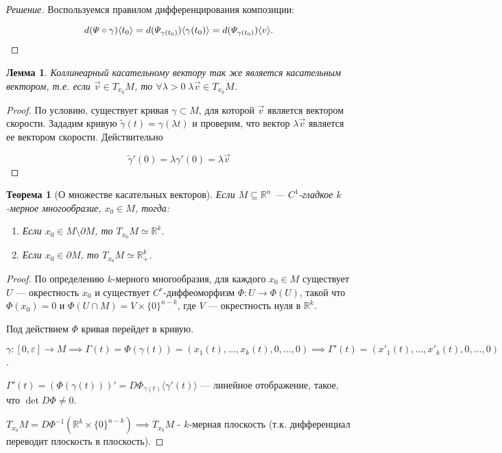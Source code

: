 \documentclass[a5paper]{article}
\newcounter{through}
\theoremstyle{plain}
\newtheorem{theorem}[through]{Теорема}
\newtheorem{lemma}[through]{Лемма}
\theoremstyle{definition}
\numberwithin{through}{section}
\numberwithin{equation}{section}
\begin{document}
\begin{proof}[Решение]
	Воспользуемся правилом дифференцирования композиции:
	
	\begin{equation*}
		d(\varPsi \circ \gamma) \langle t_0 \rangle = d(\varPsi_{\gamma(t_0)}) \langle \gamma(t_0) \rangle = 
		d(\varPsi_{\gamma(t_0)}) \langle v \rangle.
	\qedhere
	\end{equation*}
\end{proof}

\begin{lemma}
	Коллинеарный касательному вектору так же является касательным вектором, т.е. 
	если $\vec{v} \in T_{x_0}M$, то $\forall \lambda > 0 \; \lambda \vec{v} \in T_{x_0}M$.
\end{lemma}

\begin{proof}
	По условию, существует кривая $\gamma \subset M$, для которой $\vec{v}$ является вектором скорости. Зададим кривую $\tilde{\gamma}(t)=\gamma(\lambda t)$ и проверим, что вектор $\lambda \vec{v}$ является ее вектором скорости. Действительно 
	
	\begin{equation*}
		\tilde{\gamma}'(0) = \lambda \gamma'(0) = \lambda \vec{v}
	\end{equation*}
\end{proof}

\begin{theorem}[О множестве касательных векторов]
	Если $M \subseteq \mathbb{R}^n$ --- $C^1$-гладкое $k$-мерное многообразие,
	$x_0 \in M$, тогда:
	
	\begin{enumerate}
		\item 
		Если $x_0 \in M \setminus \partial M$, то $T_{x_0}M \simeq 
		\mathbb{R}^k$.
		
		\item 
		Если $x_0 \in \partial M$, то $T_{x_0}M \simeq 
		\mathbb{R}_+^k$.
	\end{enumerate}
\end{theorem}

\begin{proof}
	По определению $k$-мерного многообразия, для каждого $x_0 \in M$ существует $U$ --- окрестность $x_0$ и существует $ C^r$-диффеоморфизм $\Phi : U \to \Phi (U)$, такой что $\Phi(x_0)=0$ и $\Phi(U \cap M) = V \times \{0\}^{n-k}$, где $V$ --- окрестность нуля в $\mathbb{R}^k$.
	
	Под действием $\Phi$ кривая перейдет в кривую.
	
	$\gamma : [0, \varepsilon] \to M \implies \Gamma(t) = 
	\Phi(\gamma(t)) = (x_1(t), \ldots, x_k(t), 0, \ldots, 0) 
	\implies \Gamma'(t) =(x'_1(t), \ldots, x'_k(t), 0, \ldots, 0)$.
	
	$\Gamma'(t) = (\Phi(\gamma(t)))' = D \Phi_{\gamma(t)} \langle\gamma'(t)\rangle$ ---
	линейное отображение, такое, что $\det D \Phi \not = 0$.
	
	$T_{x_0}M = D \Phi^{-1} (\mathbb{R}^k \times \{0\}^{n-k}) \implies T_{x_0}M$ - $k$-мерная плоскость (т.к. дифференциал переводит плоскость в плоскость). 
\end{proof}
\end{document}
